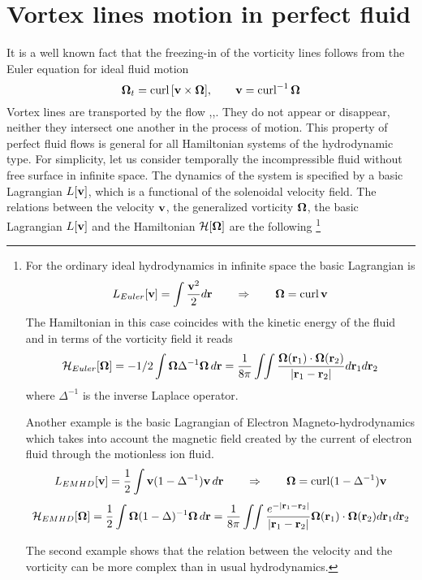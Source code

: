 \section{Vortex lines motion in perfect fluid}

It is a well known fact that the freezing-in of the vorticity lines 
follows from the Euler equation for ideal fluid motion
$$
{\bf\Omega}_t=\mbox{curl}\,[{\bf v}\times{\bf\Omega}], \qquad
{\bf v}=\mbox{curl}^{-1}\,{\bf\Omega }
$$
Vortex lines are transported by the flow \cite{Arnold},\cite{Lamb},\cite{LL6}. 
They do not appear or disappear, 
neither they intersect one another in the process of motion.
This property of perfect fluid flows is general for all Hamiltonian systems of 
the hydrodynamic type.
For simplicity, let us consider temporally the incompressible fluid without 
free surface in infinite space. The dynamics of the system is specified
by a basic Lagrangian $L[{\bf v}]$, which is a functional of the solenoidal velocity
field. The relations between the velocity ${\bf v}$,
the generalized vorticity ${\bf\Omega}$, the basic Lagrangian $L[{\bf v}]$ and
the Hamiltonian ${\cal H}[{\bf\Omega}]$ are the following \cite{R99}\footnote{
For the ordinary ideal hydrodynamics in infinite space the basic Lagrangian is
$$
L_{Euler}[{\bf v}]=\int \frac{{\bf v}^2}{2}d{\bf r}\qquad 
\Rightarrow \qquad {\bf\Omega}=\mbox{curl}\,{\bf v}
$$
The Hamiltonian in this case coincides 
with the kinetic energy of the fluid and in terms of the vorticity field it reads$$
{\cal H}_{Euler}[{\bf\Omega}]=
-1/2\int {\bf\Omega}\Delta^{-1}{\bf\Omega}\,d{\bf r}=
\frac{1}{8\pi}\int\!\!\int
\frac{{\bf\Omega}({\bf r}_1)\cdot{\bf\Omega}({\bf r}_2)}
{|{\bf r}_1-{\bf r}_2|}d{\bf r}_1d{\bf r}_2
$$
where $\Delta^{-1}$ is the inverse Laplace operator.

Another example is the basic Lagrangian of Electron Magneto-hydrodynamics
which takes into account the magnetic field created by the current of electron 
fluid through the motionless ion fluid.
$$
L_{EMHD}[{\bf v}]=\frac{1}{2}\int{\bf v}(1-\Delta^{-1}){\bf v}\,d{\bf r}\qquad 
\Rightarrow \qquad {\bf\Omega}=\mbox{curl}(1-\Delta^{-1}){\bf v}
$$
$$
{\cal H}_{EMHD}[{\bf\Omega}]=\frac{1}{2}\int 
{\bf\Omega}(1-\Delta)^{-1}{\bf\Omega}\,d{\bf r}=
\frac{1}{8\pi}\int\!\!\int
\frac{e^{-|{\bf r}_1-{\bf r}_2|}}{|{\bf r}_1-{\bf r}_2|}
{\bf\Omega}({\bf r}_1)\cdot{\bf\Omega}({\bf r}_2)d{\bf r}_1d{\bf r}_2
$$

The second example shows that the relation between the velocity and the
vorticity can be more complex than in usual hydrodynamics.
}
